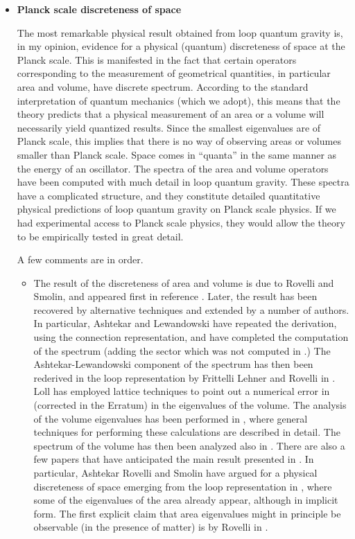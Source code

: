\begin{itemize}

\item {\bf Planck scale discreteness of space}

The most remarkable physical result obtained from loop quantum gravity 
is, in my opinion, evidence for a physical (quantum) discreteness of 
space at the Planck scale.  This is manifested in the fact that 
certain operators corresponding to the measurement of geometrical 
quantities, in particular area and volume, have discrete spectrum.  
According to the standard interpretation of quantum mechanics (which 
we adopt), this means that the theory predicts that a physical 
measurement of an area or a volume will necessarily yield quantized 
results.  Since the smallest eigenvalues are of Planck scale, this 
implies that there is no way of observing areas or volumes smaller 
than Planck scale.  Space comes in ``quanta'' in the same manner as 
the energy of an oscillator.  The spectra of the area and volume 
operators have been computed with much detail in loop quantum gravity.  
These spectra have a complicated structure, and they constitute 
detailed quantitative physical predictions of loop quantum gravity on 
Planck scale physics.  If we had experimental access to Planck scale 
physics, they would allow the theory to be empirically tested in great 
detail.

A few comments are in order.
\begin{itemize}

	\item The result of the discreteness of area and volume is due 
	to Rovelli and Smolin, and appeared first in reference 
	\cite{RovelliSmolin95}.  Later, the result has been recovered 
	by alternative techniques and extended by a number of authors.  
	In particular, Ashtekar and Lewandowski 
	\cite{AshtekarLewandowskiArea2} have repeated the derivation, 
	using the connection representation, and have completed the 
	computation of the spectrum (adding the sector which was not 
	computed in \cite{RovelliSmolin95}.)  The Ashtekar-Lewandowski 
	component of the spectrum has then been rederived in the loop 
	representation by Frittelli Lehner and Rovelli in 
	\cite{FrittelliEtAl}.  Loll has employed lattice techniques to 
	point out a numerical error in \cite{RovelliSmolin95} 
	(corrected in the Erratum) in the eigenvalues of the volume.  
	The analysis of the volume eigenvalues has been performed in 
	\cite{DePietriRovelli}, where general techniques for 
	performing these calculations are described in detail.  The 
	spectrum of the volume has then been analyzed also in 
	\cite{ThiemannVolume}.  There are also a few papers that have 
	anticipated the main result presented in 
	\cite{RovelliSmolin95}.  In particular, Ashtekar Rovelli and 
	Smolin have argued for a physical discreteness of space 
	emerging from the loop representation in \cite{weave}, where 
	some of the eigenvalues of the area already appear, although 
	in implicit form.  The first explicit claim that area 
	eigenvalues might in principle be observable (in the presence 
	of matter) is by Rovelli in \cite{RovelliArea}.


\end{itemize}
\end{itemize}

